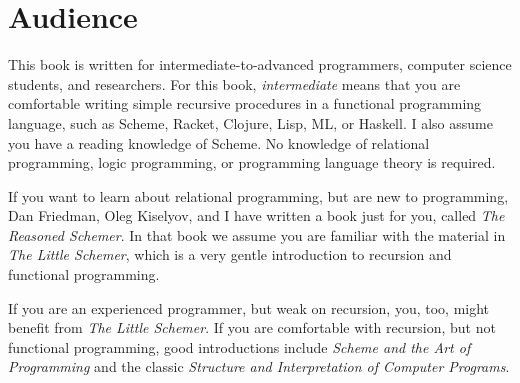 

\section{Audience}\label{sec:preface:audience}

This book is written for
intermediate-to-advanced programmers, computer science students, and
researchers.  For this book, \emph{intermediate} means that you are
comfortable writing simple recursive procedures in a functional
programming language, such as Scheme, Racket, Clojure, Lisp, ML, or
Haskell.  I also assume you have a reading knowledge of Scheme.
%
No knowledge of relational programming, logic programming, or programming
language theory is required.

If you want to learn about relational programming, but are new to
programming, Dan Friedman, Oleg Kiselyov, and I have written a book just for you, called
\emph{The Reasoned Schemer}\cite{trs}. In that book we assume you are familiar with the material in \emph{The Little
  Schemer}\cite{Friedman:1996:LS:230223}, which is a very gentle introduction to recursion and
functional programming.

If you are an experienced programmer, but weak on recursion, you, too, might
benefit from \emph{The Little Schemer}.  If you are comfortable with
recursion, but not functional programming, good introductions include
\emph{Scheme and the Art of Programming}\cite{Springer:1989:Art} and
the classic \emph{Structure and Interpretation of Computer
  Programs}\cite{Abelson:1996:SIC:547755}.

